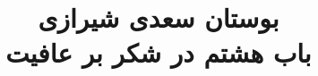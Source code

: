 \documentclass[14pt,b5paper]{article}
\begin{document}
\title{\Huge بوستان سعدی شیرازی \\
باب هشتم در شکر بر عافیت}
\author{ }
\date{ }
\maketitle
\newpage
\tableofcontents
\newpage

\newpage

\newpage

\newpage

\newpage

\newpage

\newpage

\newpage

\newpage

\newpage

\newpage

\newpage

\newpage

\newpage

\newpage

\newpage
\end{document}
